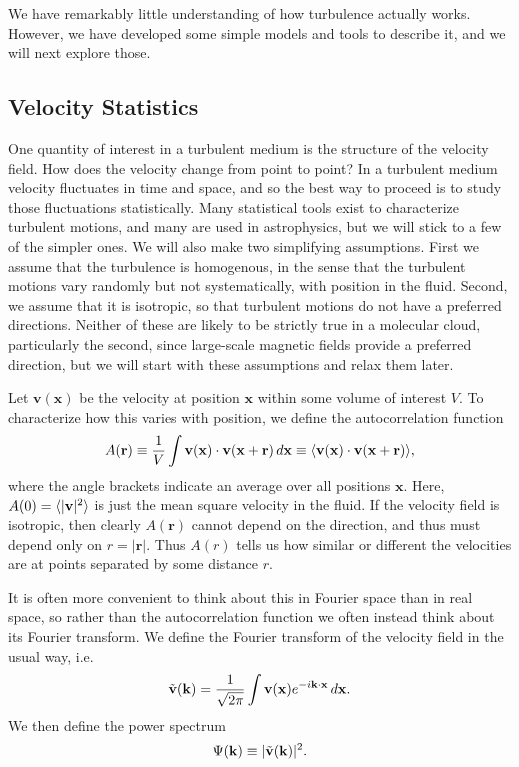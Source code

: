 We have remarkably little understanding of how turbulence actually works. However, we have developed some simple models and tools to describe it, and we will next explore those.

\subsection{Velocity Statistics}

One quantity of interest in a turbulent medium is the structure of the velocity field. How does the velocity change from point to point?  In a turbulent medium velocity fluctuates in time and space, and so the best way to proceed is to study those fluctuations statistically. Many statistical tools exist to characterize turbulent motions, and many are used in astrophysics, but we will stick to a few of the simpler ones. We will also make two simplifying assumptions. First we assume that the turbulence is homogenous, in the sense that the turbulent motions vary randomly but not systematically, with position in the fluid. Second, we assume that it is isotropic, so that turbulent motions do not have a preferred directions. Neither of these are likely to be strictly true in a molecular cloud, particularly the second, since large-scale magnetic fields provide a preferred direction, but we will start with these assumptions and relax them later.

Let $\mathbf{v}(\mathbf{x})$ be the velocity at position $\mathbf{x}$ within some volume of interest $V$. To characterize how this varies with position, we define the autocorrelation function
\begin{equation}
A(\mathbf{r})\equiv \frac{1}{V} \int \mathbf{v}(\mathbf{x})\cdot \mathbf{v}(\mathbf{x}+\mathbf{r}) \, d\mathbf{x} \equiv \langle \mathbf{v}(\mathbf{x}) \cdot \mathbf{v}(\mathbf{x}+\mathbf{r})\rangle,
\end{equation}
where the angle brackets indicate an average over all positions $\mathbf{x}$. Here, $A(0) = \langle|\mathbf{v}|^2\rangle$ is just the mean square velocity in the fluid. If the velocity field is isotropic, then clearly $A(\mathbf{r})$ cannot depend on the direction, and thus must depend only on $r=|\mathbf{r}|$. Thus $A(r)$ tells us how similar or different the velocities are at points separated by some distance $r$.

It is often more convenient to think about this in Fourier space than in real space, so rather than the autocorrelation function we often instead think about its Fourier transform. We define the Fourier transform of the velocity field in the usual way, i.e.\
\begin{equation}
\tilde{\mathbf{v}}(\mathbf{k}) = \frac{1}{\sqrt{2\pi}}\int \mathbf{v}(\mathbf{x}) e^{-i\mathbf{k}\cdot\mathbf{x}} \,d\mathbf{x}.
\end{equation}
We then define the power spectrum
\begin{equation}
\Psi(\mathbf{k}) \equiv | \tilde{\mathbf{v}}(\mathbf{k})|^2.
\end{equation}

